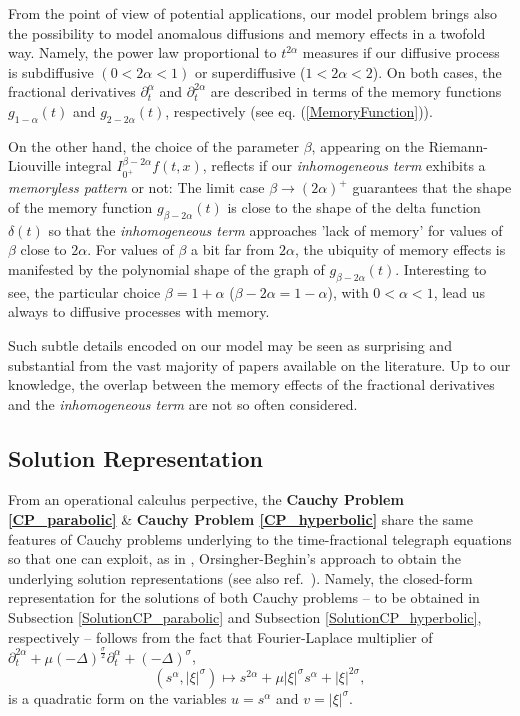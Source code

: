 \documentclass{amsart}
\theoremstyle{definition}
\theoremstyle{remark}
\numberwithin{equation}{section}
\begin{document}
From the point of view of potential applications, our model problem brings also the possibility to model anomalous diffusions and memory effects in a twofold way. Namely, the power law proportional to $t^{2\alpha}$ measures if our diffusive process is subdiffusive $(0<2\alpha<1)$ or superdiffusive ($1<2\alpha<2$). On both cases, the fractional derivatives $\partial_t^{\alpha}$ and $\partial_t^{2\alpha}$ are described in terms of the memory functions $g_{1-\alpha}(t)$ and $g_{2-2\alpha}(t)$, respectively (see eq. (\ref{MemoryFunction})).  

On the other hand, the choice of the parameter $\beta$, appearing on the Riemann-Liouville integral $I^{\beta-2\alpha}_{0^+}f(t,x)$, reflects if our {\it inhomogeneous term} exhibits a {\it memoryless pattern} or not: The limit case $\beta\rightarrow (2\alpha)^+$ guarantees that the shape of the memory function $g_{\beta-2\alpha}(t)$ is close to the shape of the delta function $\delta(t)$ so that the {\it inhomogeneous term} approaches 'lack of memory' for values of $\beta$ close to $2\alpha$. For values of $\beta$ a bit far from $2\alpha$, the ubiquity of memory effects is manifested by the polynomial shape of the graph of $g_{\beta-2\alpha}(t)$. Interesting to see, the particular choice $\beta=1+\alpha$ ($\beta-2\alpha=1-\alpha$), with $0<\alpha<1$, lead us always to diffusive processes with memory. 

Such subtle details encoded on our model may be seen as surprising and substantial from the vast majority of papers available on the literature. Up to our knowledge, the overlap between the memory effects of the fractional derivatives and the {\it inhomogeneous term} are not so often considered. 

\subsection{Solution Representation}


From an operational calculus perpective, the {\bf Cauchy Problem \ref{CP_parabolic}} \& {\bf Cauchy Problem \ref{CP_hyperbolic}} share the same features of Cauchy problems underlying to the time-fractional telegraph equations so that one can exploit, as in \cite{LVaz20}, Orsingher-Beghin's approach \cite{OrsingherBeghin04} to obtain the underlying solution representations (see also ref.~\cite{LLPMeersch19}). Namely, the 
closed-form representation for the solutions of both Cauchy problems -- to be obtained in Subsection \ref{SolutionCP_parabolic} and Subsection \ref{SolutionCP_hyperbolic}, respectively -- follows from the fact that Fourier-Laplace multiplier of $\displaystyle \partial^{2\alpha}_t +\mu (-\Delta)^{\frac{\sigma}{2}}\partial^\alpha_t+(-\Delta)^\sigma$, $$(s^\alpha,|\xi|^\sigma)\mapsto s^{2\alpha}+\mu |\xi|^{\sigma}s^\alpha+|\xi|^{2\sigma},$$
is a quadratic form on the variables $u=s^\alpha$ and $v=|\xi|^\sigma$.
\end{document}
